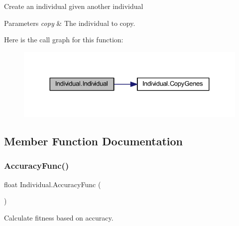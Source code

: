 Create an individual given another individual 


\begin{DoxyParams}{Parameters}
{\em copy} & The individual to copy.\\
\hline
\end{DoxyParams}
Here is the call graph for this function\+:\nopagebreak
\begin{figure}[H]
\begin{center}
\leavevmode
\includegraphics[width=324pt]{class_individual_a9ae7902f014f58e296bdd87083635756_cgraph}
\end{center}
\end{figure}


\subsection{Member Function Documentation}
\mbox{\label{class_individual_ae29881ad8bfa0ec8db58c650ac33eaf0}} 
\subsubsection{\texorpdfstring{Accuracy\+Func()}{AccuracyFunc()}}
{\footnotesize\ttfamily float Individual.\+Accuracy\+Func (\begin{DoxyParamCaption}{ }\end{DoxyParamCaption})}



Calculate fitness based on accuracy. 

